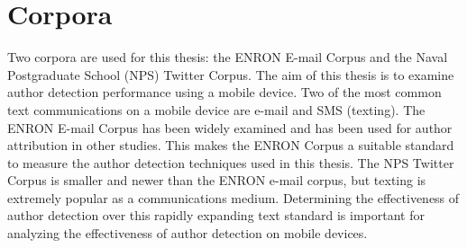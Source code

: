 \section{Corpora} Two corpora are used for this thesis: the ENRON E-mail Corpus and the Naval Postgraduate School (NPS) Twitter Corpus.  The aim of this thesis is to examine author detection performance using a mobile device.  Two of the most common text communications on a mobile device are e-mail and SMS (texting).  The ENRON E-mail Corpus has been widely examined and has been used for author attribution in other studies.  This makes the ENRON Corpus a suitable standard to measure the author detection techniques used in this thesis.  The NPS Twitter Corpus is smaller and newer than the ENRON e-mail corpus, but texting is extremely popular as a communications medium.  Determining the effectiveness of author detection over this rapidly expanding text standard is important for analyzing the effectiveness of author detection on mobile devices.
